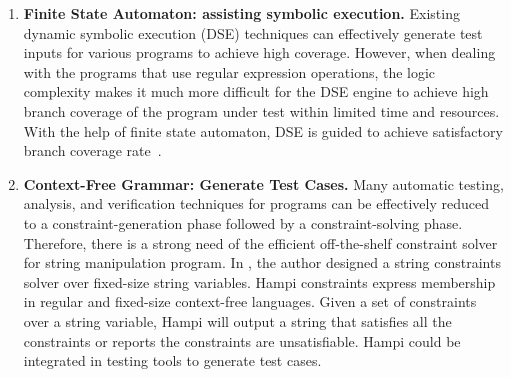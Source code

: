 \documentclass[times, 10pt,onecolumn]{article}
\begin{document}
\begin{enumerate}
\item{\textbf{Finite State Automaton: assisting symbolic execution.} Existing dynamic symbolic execution (DSE) techniques can effectively generate test inputs for various programs to achieve high coverage. However, when dealing with the programs that use regular expression operations, the logic complexity makes it much more difficult for the DSE engine to achieve high branch coverage of the program under test within limited time and resources. With the help of finite state automaton, DSE is guided to achieve satisfactory branch coverage rate~\cite{reggae}.}

\item{\textbf{Context-Free Grammar: Generate Test Cases.} Many automatic testing, analysis, and verification techniques for programs can be effectively reduced to a constraint-generation phase followed by a constraint-solving phase. Therefore, there is a strong need of the efficient off-the-shelf constraint solver for string manipulation program. In \cite{hampi}, the author designed a string constraints solver over fixed-size string variables. Hampi constraints express membership in regular and fixed-size context-free languages. Given a set of constraints over a string variable, Hampi will output a string that satisfies all the constraints or reports the constraints are unsatisfiable. Hampi could be integrated in testing tools to generate test cases. }


\end{enumerate}
\end{document}
